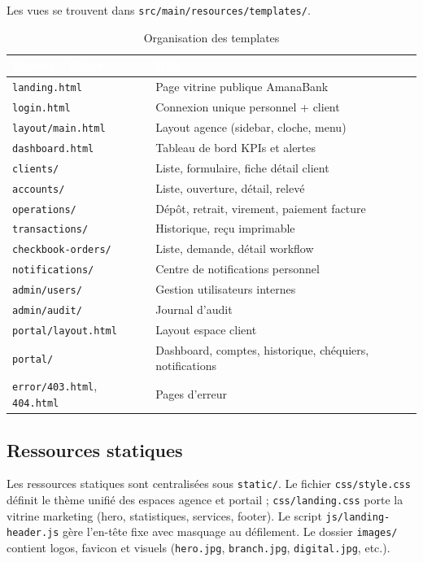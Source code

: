 \documentclass[11pt,a4paper,oneside]{report}
\newcommand{\tabhead}[1]{\textcolor{white}{\textbf{#1}}}
\begin{document}
Les vues se trouvent dans \texttt{src/main/resources/templates/}.

\begin{table}[H]
    \centering
    \caption{Organisation des templates}
    \label{tab:templates}
    \small
    \begin{tabular}{@{}lp{9cm}@{}}
        \rowcolor{AmanaBrown}
        \tabhead{Dossier / fichier} & \tabhead{Rôle} \\
        \midrule
        \texttt{landing.html} & Page vitrine publique AmanaBank \\
        \texttt{login.html} & Connexion unique personnel + client \\
        \texttt{layout/main.html} & Layout agence (sidebar, cloche, menu) \\
        \texttt{dashboard.html} & Tableau de bord KPIs et alertes \\
        \texttt{clients/} & Liste, formulaire, fiche détail client \\
        \texttt{accounts/} & Liste, ouverture, détail, relevé \\
        \texttt{operations/} & Dépôt, retrait, virement, paiement facture \\
        \texttt{transactions/} & Historique, reçu imprimable \\
        \texttt{checkbook-orders/} & Liste, demande, détail workflow \\
        \texttt{notifications/} & Centre de notifications personnel \\
        \texttt{admin/users/} & Gestion utilisateurs internes \\
        \texttt{admin/audit/} & Journal d'audit \\
        \texttt{portal/layout.html} & Layout espace client \\
        \texttt{portal/} & Dashboard, comptes, historique, chéquiers, notifications \\
        \texttt{error/403.html}, \texttt{404.html} & Pages d'erreur \\
        \bottomrule
    \end{tabular}
\end{table}

\subsection{Ressources statiques}

Les ressources statiques sont centralisées sous \texttt{static/}. Le fichier \texttt{css/style.css} définit le thème unifié des espaces agence et portail ; \texttt{css/landing.css} porte la vitrine marketing (hero, statistiques, services, footer). Le script \texttt{js/landing-header.js} gère l'en-tête fixe avec masquage au défilement. Le dossier \texttt{images/} contient logos, favicon et visuels (\texttt{hero.jpg}, \texttt{branch.jpg}, \texttt{digital.jpg}, etc.).
\end{document}

